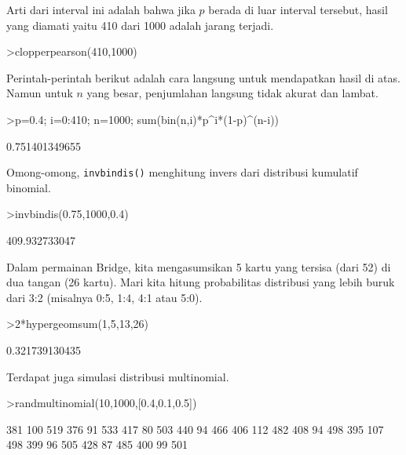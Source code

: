 \documentclass[a4paper,11pt,oneside,enabledeprecatedfontcommands]{scrbook}
\newenvironment{eulernotebook}{}{}
\newenvironment{eulercomment}{\par\medskip\noindent}{\par\medskip}
\begin{document}
\begin{eulernotebook}
\begin{eulercomment}
			Arti dari interval ini adalah bahwa jika $p$ berada di luar interval tersebut, hasil yang diamati yaitu
			410 dari 1000 adalah jarang terjadi.
		\end{eulercomment}
		\begin{eulerprompt}
			>clopperpearson(410,1000)
		\end{eulerprompt}
		\begin{euleroutput}
			[0.37932,  0.441212]
		\end{euleroutput}
		\begin{eulercomment}
			Perintah-perintah berikut adalah cara langsung untuk mendapatkan hasil di atas. Namun untuk $n$ yang
			besar, penjumlahan langsung tidak akurat dan lambat.
		\end{eulercomment}
		\begin{eulerprompt}
			>p=0.4; i=0:410; n=1000; sum(bin(n,i)*p^i*(1-p)^(n-i))
		\end{eulerprompt}
		\begin{euleroutput}
			0.751401349655
		\end{euleroutput}
		\begin{eulercomment}
			Omong-omong, \texttt{invbindis()} menghitung invers dari distribusi kumulatif binomial.
		\end{eulercomment}
		\begin{eulerprompt}
			>invbindis(0.75,1000,0.4)
		\end{eulerprompt}
		\begin{euleroutput}
			409.932733047
		\end{euleroutput}
		\begin{eulercomment}
			Dalam permainan Bridge, kita mengasumsikan 5 kartu yang tersisa (dari 52) di dua tangan (26 kartu).
			Mari kita hitung probabilitas distribusi yang lebih buruk dari 3:2 (misalnya 0:5, 1:4, 4:1 atau 5:0).
		\end{eulercomment}
		\begin{eulerprompt}
			>2*hypergeomsum(1,5,13,26)
		\end{eulerprompt}
		\begin{euleroutput}
			0.321739130435
		\end{euleroutput}
		\begin{eulercomment}
			Terdapat juga simulasi distribusi multinomial.
		\end{eulercomment}
		\begin{eulerprompt}
			>randmultinomial(10,1000,[0.4,0.1,0.5])
		\end{eulerprompt}
		\begin{euleroutput}
			      381           100           519 
			      376            91           533 
			      417            80           503 
			      440            94           466 
			      406           112           482 
			      408            94           498 
			      395           107           498 
			      399            96           505 
			      428            87           485 
			      400            99           501 
		\end{euleroutput}
		

\end{eulernotebook}
\end{document}
